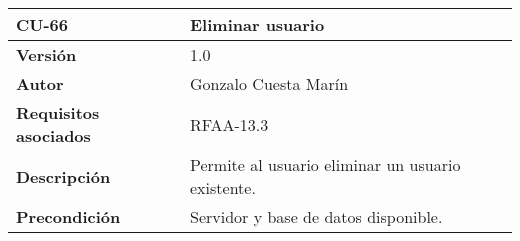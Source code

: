 \begin{longtable}[]{@{}ll@{}}
\toprule
\begin{minipage}[b]{0.26\columnwidth}\raggedright
\textbf{CU-66}\strut
\end{minipage} & \begin{minipage}[b]{0.68\columnwidth}\raggedright
\textbf{Eliminar usuario}\strut
\end{minipage}\tabularnewline
\midrule
\endhead
\begin{minipage}[t]{0.26\columnwidth}\raggedright
\textbf{Versión}\strut
\end{minipage} & \begin{minipage}[t]{0.68\columnwidth}\raggedright
1.0\strut
\end{minipage}\tabularnewline
\begin{minipage}[t]{0.26\columnwidth}\raggedright
\textbf{Autor}\strut
\end{minipage} & \begin{minipage}[t]{0.68\columnwidth}\raggedright
Gonzalo Cuesta Marín\strut
\end{minipage}\tabularnewline
\begin{minipage}[t]{0.26\columnwidth}\raggedright
\textbf{Requisitos asociados}\strut
\end{minipage} & \begin{minipage}[t]{0.68\columnwidth}\raggedright
RFAA-13.3\strut
\end{minipage}\tabularnewline
\begin{minipage}[t]{0.26\columnwidth}\raggedright
\textbf{Descripción}\strut
\end{minipage} & \begin{minipage}[t]{0.68\columnwidth}\raggedright
Permite al usuario eliminar un usuario existente.\strut
\end{minipage}\tabularnewline
\begin{minipage}[t]{0.26\columnwidth}\raggedright
\textbf{Precondición}\strut
\end{minipage} & \begin{minipage}[t]{0.68\columnwidth}\raggedright
Servidor y base de datos disponible.


\end{minipage}
\end{longtable}
